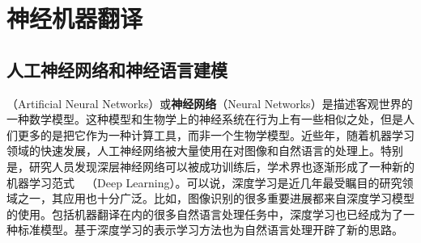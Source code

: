 
%

\part{神经机器翻译}

\renewcommand\figurename{图}%
\renewcommand\tablename{表}%


\chapter{人工神经网络和神经语言建模}

（Artificial Neural Networks）或{\small\sffamily\bfseries{神经网络}}（Neural Networks）是描述客观世界的一种数学模型。这种模型和生物学上的神经系统在行为上有一些相似之处，但是人们更多的是把它作为一种计算工具，而非一个生物学模型。近些年，随着机器学习领域的快速发展，人工神经网络被大量使用在对图像和自然语言的处理上。特别是，研究人员发现深层神经网络可以被成功训练后，学术界也逐渐形成了一种新的机器学习范式\ \dash \ {\small{}}（Deep Learning）。可以说，深度学习是近几年最受瞩目的研究领域之一，其应用也十分广泛。比如，图像识别的很多重要进展都来自深度学习模型的使用。包括机器翻译在内的很多自然语言处理任务中，深度学习也已经成为了一种标准模型。基于深度学习的表示学习方法也为自然语言处理开辟了新的思路。

